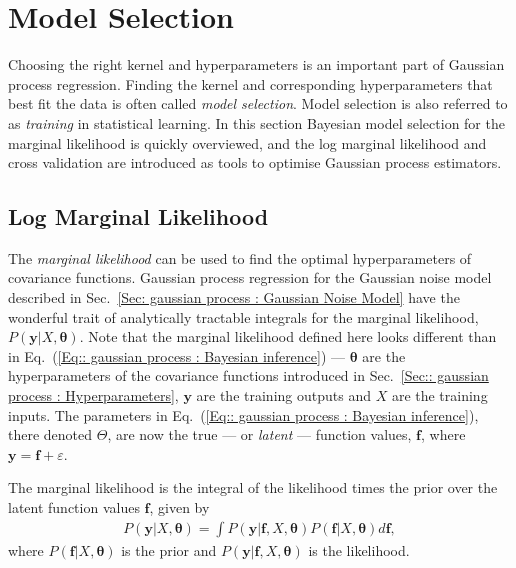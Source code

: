\documentclass[twoside,english]{uiofysmaster}
\begin{document}
{{\section{Model Selection}

Choosing the right kernel and hyperparameters is an important part of Gaussian process regression. Finding the  kernel and corresponding hyperparameters that best fit the data is often called \textit{model selection}. Model selection is also referred to as \textit{training} in statistical learning. In this section Bayesian model selection for the marginal likelihood is quickly overviewed, and the log marginal likelihood and cross validation are introduced as tools to optimise Gaussian process estimators.

\subsection{Log Marginal Likelihood}\label{Sec:: gaussian process : Log Marginal Likelihood}



The \textit{marginal likelihood} can be used to find the optimal hyperparameters of covariance functions. Gaussian process regression for the Gaussian noise model described in Sec.~\ref{Sec: gaussian process : Gaussian Noise Model} have the wonderful trait of analytically tractable integrals for the marginal likelihood, $P(\textbf{y}|X, \boldsymbol{\theta})$. Note that the marginal likelihood defined here looks different than in Eq.~(\ref{Eq:: gaussian process : Bayesian inference}) --- $\boldsymbol{\theta}$ are the hyperparameters of the covariance functions introduced in Sec.~\ref{Sec:: gaussian process : Hyperparameters}, $\textbf{y}$ are the training outputs and $X$ are the training inputs. The parameters in Eq.~(\ref{Eq:: gaussian process : Bayesian inference}), there denoted $\Theta$, are now the true --- or \textit{latent} --- function values, $\textbf{f}$, where $\textbf{y} = \textbf{f} + \varepsilon$. 

The marginal likelihood is the integral of the likelihood times the prior over the latent function values $\textbf{f}$, given by
\begin{align}\label{Eq:: gaussian process : Marginal likelihood}
P(\textbf{y} | X, \boldsymbol{\theta}) = \int P(\textbf{y}| \textbf{f}, X, \boldsymbol{\theta}) P (\textbf{f}|X, \boldsymbol{\theta})d \textbf{f},
\end{align}
where $P(\textbf{f}|X, \boldsymbol{\theta})$ is the prior and $P(\textbf{y}|\textbf{f},X, \boldsymbol{\theta})$ is the likelihood. 

}}
\end{document}

